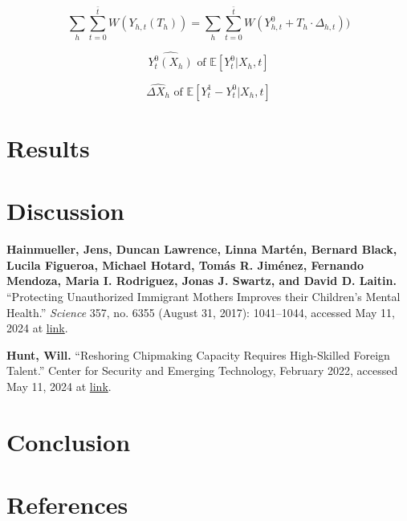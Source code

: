 \documentclass{article}
\begin{document}
\[ \sum_{h} \sum_{t=0}^{\bar t} W(Y_{h,t}(T_h)) = 
\sum_{h} \sum_{t=0}^{\bar t} W(Y_{h,t}^0 + T_h \cdot \Delta_{h,t}))
\]

\[ \hat{Y_t^0(X_h)} \text{ of } \mathbb{E} [Y_t^0 \rvert X_h ,t ] \]

\[ \hat{\Delta X_h} \text{ of } \mathbb{E} [Y_t^1 - Y_t^0 \rvert X_h ,t ] \]  

\section{Results}

\section{Discussion}

\begin{hangparas}{.25in}{1}

\textbf{Hainmueller, Jens, Duncan Lawrence, Linna Martén, Bernard Black, Lucila Figueroa, Michael Hotard, Tomás R. Jiménez, Fernando Mendoza, Maria I. Rodriguez, Jonas J. Swartz, and David D. Laitin.} “Protecting Unauthorized Immigrant Mothers Improves their Children’s Mental Health.” \textit{Science} 357, no. 6355 (August 31, 2017): 1041–1044, accessed May 11, 2024 at \href{https://www.science.org/doi/10.1126/science.aan5893}{link}.

\textbf{Hunt, Will. }“Reshoring Chipmaking Capacity Requires High-Skilled Foreign Talent.” Center for Security and Emerging Technology, February 2022, accessed May 11, 2024 at \href{https://doi.org/10.51593/20210065}{link}.

\end{hangparas}

\section{Conclusion}
\section{References}
\end{document}
